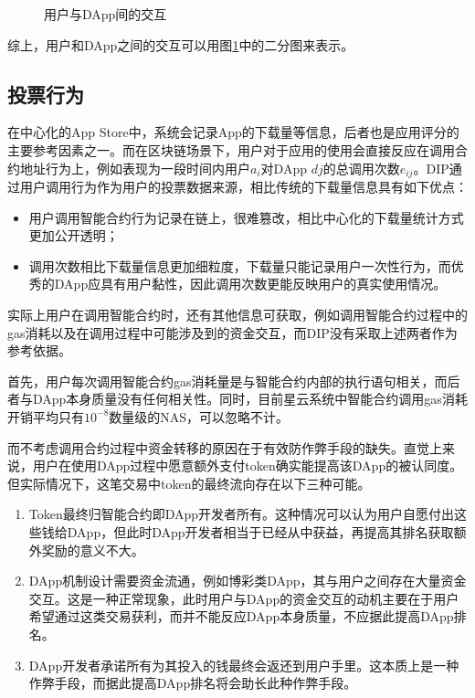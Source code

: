 \begin{figure}
	\centering
  
\caption{用户与DApp间的交互 \label{fig:interact}}
\end{figure}

综上，用户和DApp之间的交互可以用图\ref{fig:interact}中的二分图来表示。

\subsection{投票行为}
在中心化的App Store中，系统会记录App的下载量等信息，后者也是应用评分的主要参考因素之一。而在区块链场景下，用户对于应用的使用会直接反应在调用合约地址行为上，例如表现为一段时间内用户$a_i$对DApp $dj$的总调用次数$e_{ij}$。DIP通过用户调用行为作为用户的投票数据来源，相比传统的下载量信息具有如下优点：
\begin{itemize}
	\item 用户调用智能合约行为记录在链上，很难篡改，相比中心化的下载量统计方式更加公开透明；
	\item 调用次数相比下载量信息更加细粒度，下载量只能记录用户一次性行为，而优秀的DApp应具有用户黏性，因此调用次数更能反映用户的真实使用情况。
\end{itemize}

实际上用户在调用智能合约时，还有其他信息可获取，例如调用智能合约过程中的gas消耗以及在调用过程中可能涉及到的资金交互，而DIP没有采取上述两者作为参考依据。

首先，用户每次调用智能合约gas消耗量是与智能合约内部的执行语句相关，而后者与DApp本身质量没有任何相关性。同时，目前星云系统中智能合约调用gas消耗开销平均只有$10^{-8}$数量级的NAS，可以忽略不计。


而不考虑调用合约过程中资金转移的原因在于有效防作弊手段的缺失。直觉上来说，用户在使用DApp过程中愿意额外支付token确实能提高该DApp的被认同度。但实际情况下，这笔交易中token的最终流向存在以下三种可能。
\begin{enumerate}
\item Token最终归智能合约即DApp开发者所有。这种情况可以认为用户自愿付出这些钱给DApp，但此时DApp开发者相当于已经从中获益，再提高其排名获取额外奖励的意义不大。

\item DApp机制设计需要资金流通，例如博彩类DApp，其与用户之间存在大量资金交互。这是一种正常现象，此时用户与DApp的资金交互的动机主要在于用户希望通过这类交易获利，而并不能反应DApp本身质量，不应据此提高DApp排名。

\item DApp开发者承诺所有为其投入的钱最终会返还到用户手里。这本质上是一种作弊手段，而据此提高DApp排名将会助长此种作弊手段。
\end{enumerate}

